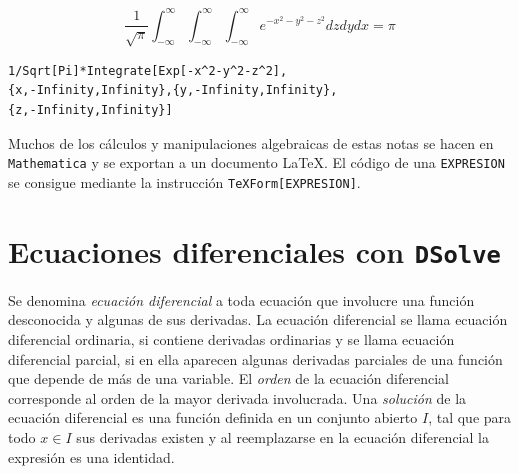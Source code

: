 \begin{parrafonumerado}
      \item %
        $$\frac{1}{\sqrt{\pi }}\int_{-\infty}^{\infty}\int_{-\infty}^{\infty}\int_{-\infty}^{\infty}e^{-x^{2}-y^{2}-z^{2}}dzdydx= \pi $$
        \begin{tcolorbox}
\begin{Verbatim}[formatcom=\letraverbatim]
1/Sqrt[Pi]*Integrate[Exp[-x^2-y^2-z^2],
{x,-Infinity,Infinity},{y,-Infinity,Infinity},
{z,-Infinity,Infinity}]
\end{Verbatim}
        \end{tcolorbox}
      \end{parrafonumerado}

      Muchos de los cálculos y manipulaciones algebraicas de estas notas se hacen en \verb"Mathematica"
      y se exportan a un documento \LaTeX.
      El código de una \verb"EXPRESION" se consigue mediante la instrucción
      \verb"TeXForm[EXPRESION]". 
      \section{Ecuaciones diferenciales con {\tt DSolve}}
      Se denomina \emph{ecuación diferencial} a toda ecuación que involucre
      una función desconocida y algunas de sus derivadas. La ecuación
      diferencial se llama ecuación diferencial ordinaria, si contiene
      derivadas ordinarias y se llama ecuación diferencial parcial, si en ella
      aparecen algunas derivadas parciales de una función que depende de más de una variable.
      El \emph{orden} de la ecuación diferencial corresponde al orden de la mayor derivada involucrada.
      Una \emph{solución} de la ecuación diferencial es una función definida en un conjunto abierto $I$, tal que para todo $x\in I$ sus derivadas existen y al reemplazarse en la ecuación diferencial la expresión es una identidad.

